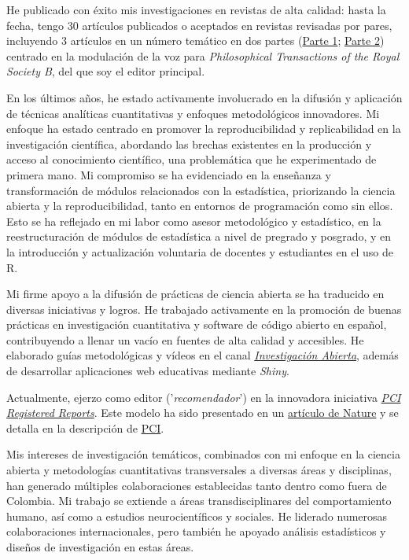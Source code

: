 \documentclass[11pt,a4paper,]{awesome-cv}
\begin{document}
\begin{small}
He publicado con éxito mis investigaciones en revistas de alta calidad: hasta la fecha, tengo 30 artículos publicados o aceptados en revistas revisadas por pares, incluyendo 3 artículos \autocite{kleisner2021,leongomez2021,leongomez2022} en un número temático en dos partes (\href{https://royalsocietypublishing.org/toc/rstb/2021/376/1840}{Parte 1}; \href{https://royalsocietypublishing.org/toc/rstb/2022/377/1841}{Parte 2}) centrado en la modulación de la voz para \textit{Philosophical Transactions of the Royal Society B}, del que soy el editor principal.

En los últimos años, he estado activamente involucrado en la difusión y aplicación de técnicas analíticas cuantitativas y enfoques metodológicos innovadores. Mi enfoque ha estado centrado en promover la reproducibilidad y replicabilidad en la investigación científica, abordando las brechas existentes en la producción y acceso al conocimiento científico, una problemática que he experimentado de primera mano. Mi compromiso se ha evidenciado en la enseñanza y transformación de módulos relacionados con la estadística, priorizando la ciencia abierta y la reproducibilidad, tanto en entornos de programación como sin ellos. Esto se ha reflejado en mi labor como asesor metodológico y estadístico, en la reestructuración de módulos de estadística a nivel de pregrado y posgrado, y en la introducción y actualización voluntaria de docentes y estudiantes en el uso de R.

Mi firme apoyo a la difusión de prácticas de ciencia abierta se ha traducido en diversas iniciativas y logros. He trabajado activamente en la promoción de buenas prácticas en investigación cuantitativa y software de código abierto en español, contribuyendo a llenar un vacío en fuentes de alta calidad y accesibles. He elaborado guías metodológicas y vídeos en el canal \href{https://www.youtube.com/@InvestigacionAbierta}{\textit{Investigación Abierta}}, además de desarrollar aplicaciones web educativas mediante \textit{Shiny}.

Actualmente, ejerzo como editor ('\textit{recomendador}') en la innovadora iniciativa \href{https://rr.peercommunityin.org/}{\textit{PCI Registered Reports}}. Este modelo ha sido presentado en un \href{https://www.nature.com/articles/d41586-023-03342-6}{artículo de Nature} y se detalla en la descripción de \href{https://rr.peercommunityin.org/about/about}{PCI}.

Mis intereses de investigación temáticos, combinados con mi enfoque en la ciencia abierta y metodologías cuantitativas transversales a diversas áreas y disciplinas, han generado múltiples colaboraciones establecidas tanto dentro como fuera de Colombia. Mi trabajo se extiende a áreas transdisciplinares del comportamiento humano, así como a estudios neurocientíficos y sociales. He liderado numerosas colaboraciones internacionales, pero también he apoyado análisis estadísticos y diseños de investigación en estas áreas.


\end{small}
\end{document}

